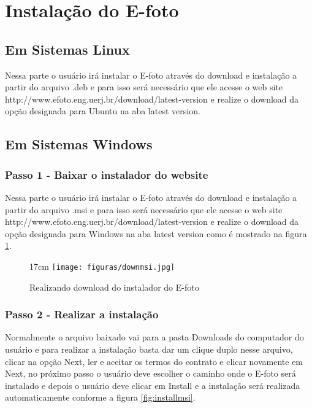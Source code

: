 \section{Instalação do E-foto}
\subsection{Em Sistemas Linux}
Nessa parte o usuário irá instalar o E-foto através do download e instalação a partir do arquivo .deb e para isso será necessário que ele acesse o web site http://www.efoto.eng.uerj.br/download/latest-version e realize o download da opção designada para Ubuntu na aba latest version.
\subsection{Em Sistemas Windows}
\subsubsection{Passo 1 - Baixar o instalador do website}
Nessa parte o usuário irá instalar o E-foto através do download e instalação a partir do arquivo .msi e para isso será necessário que ele acesse o web site http://www.efoto.eng.uerj.br/download/latest-version e realize o download da opção designada para Windows na aba latest version como é mostrado na figura \ref{fig:downmsi}.

\begin{figure}[!ht]{17cm}
	\texttt{[image: figuras/downmsi.jpg]}
	\caption{Realizando download do instalador do E-foto} \label{fig:downmsi}
\end{figure}

\subsubsection{Passo 2 - Realizar a instalação}
Normalmente o arquivo baixado vai para a pasta Downloads do computador do usuário e para realizar a instalação basta dar um clique duplo nesse arquivo, clicar na opção Next, ler e aceitar os termos do contrato e clicar novamente em Next, no próximo passo o usuário deve escolher o caminho onde o E-foto será instalado e depois o usuário deve clicar em Install e a instalação será realizada automaticamente conforme a figura \ref{fig:installmsi}.
 
